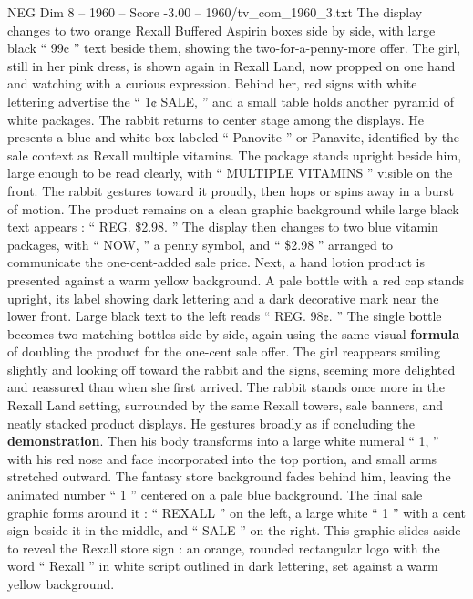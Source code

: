 \begin{textsample}{NEG Dim 8 – 1960 – Score -3.00 – 1960/tv\_com\_1960\_3.txt}
The display changes to two orange Rexall Buffered Aspirin boxes side by side, with large black “ 99¢ ” text beside them, showing the two-for-a-penny-more offer.
The girl, still in her pink dress, is shown again in Rexall Land, now propped on one hand and watching with a curious expression.
Behind her, red signs with white lettering advertise the “ 1¢ SALE, ” and a small table holds another pyramid of white packages.
The rabbit returns to center stage among the displays.
He presents a blue and white box labeled “ Panovite ” or Panavite, identified by the sale context as Rexall multiple vitamins.
The package stands upright beside him, large enough to be read clearly, with “ MULTIPLE VITAMINS ” visible on the front.
The rabbit gestures toward it proudly, then hops or spins away in a burst of motion.
The product remains on a clean graphic background while large black text appears : “ REG. \$2.98. ” The display then changes to two blue vitamin packages, with “ NOW, ” a penny symbol, and “ \$2.98 ” arranged to communicate the one-cent-added sale price.
Next, a hand lotion product is presented against a warm yellow background.
A pale bottle with a red cap stands upright, its label showing dark lettering and a dark decorative mark near the lower front.
Large black text to the left reads “ REG. 98¢. ” The single bottle becomes two matching bottles side by side, again using the same visual \textbf{formula} of doubling the product for the one-cent sale offer.
The girl reappears smiling slightly and looking off toward the rabbit and the signs, seeming more delighted and reassured than when she first arrived.
The rabbit stands once more in the Rexall Land setting, surrounded by the same Rexall towers, sale banners, and neatly stacked product displays.
He gestures broadly as if concluding the \textbf{demonstration}.
Then his body transforms into a large white numeral “ 1, ” with his red nose and face incorporated into the top portion, and small arms stretched outward.
The fantasy store background fades behind him, leaving the animated number “ 1 ” centered on a pale blue background.
The final sale graphic forms around it : “ REXALL ” on the left, a large white “ 1 ” with a cent sign beside it in the middle, and “ SALE ” on the right.
This graphic slides aside to reveal the Rexall store sign : an orange, rounded rectangular logo with the word “ Rexall ” in white script outlined in dark lettering, set against a warm yellow background.

\end{textsample}
